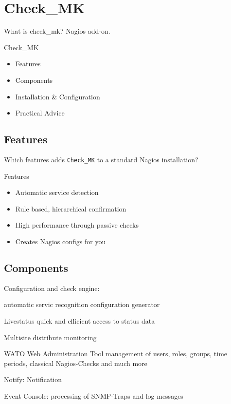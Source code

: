\section{Check\_MK}

What is check\_mk? Nagios add-on.

\begin{frame}[fragile]{Check\_MK}
\begin{itemize}
\item Features
\item Components
\item Installation \& Configuration
\item Practical Advice
\end{itemize}
\end{frame}

\subsection{Features}

Which features adds \verb|Check_MK| to a standard Nagios installation?

\begin{frame}[fragile]{Features}
\begin{itemize}
\item Automatic service detection
\item Rule based, hierarchical confirmation
\item High performance through passive checks
\item Creates Nagios configs for you
\end{itemize}
\end{frame}

\subsection{Components}

Configuration and check engine:

automatic servic recognition
configuration generator

Livestatus
quick and efficient access to status data

Multisite
distribute monitoring

WATO
Web Administration Tool
management of users, roles, groups, time periods, 
classical Nagios-Checks and much more

Notify:
Notification

Event Console:
processing of SNMP-Traps and log messages

